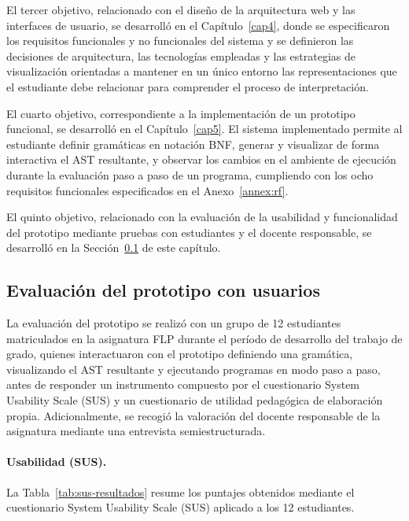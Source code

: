 El tercer objetivo, relacionado con el diseño de la arquitectura web y las interfaces de usuario, se desarrolló en el Capítulo~\ref{cap4}, donde se especificaron los requisitos funcionales y no funcionales del sistema y se definieron las decisiones de arquitectura, las tecnologías empleadas y las estrategias de visualización orientadas a mantener en un único entorno las representaciones que el estudiante debe relacionar para comprender el proceso de interpretación.

El cuarto objetivo, correspondiente a la implementación de un prototipo funcional, se desarrolló en el Capítulo~\ref{cap5}. El sistema implementado permite al estudiante definir gramáticas en notación BNF, generar y visualizar de forma interactiva el AST resultante, y observar los cambios en el ambiente de ejecución durante la evaluación paso a paso de un programa, cumpliendo con los ocho requisitos funcionales especificados en el Anexo~\ref{annex:rf}.

El quinto objetivo, relacionado con la evaluación de la usabilidad y funcionalidad del prototipo mediante pruebas con estudiantes y el docente responsable, se desarrolló en la Sección~\ref{sec:evaluacion-prototipo} de este capítulo.

\subsection{Evaluación del prototipo con usuarios}
\label{sec:evaluacion-prototipo}

La evaluación del prototipo se realizó con un grupo de 12 estudiantes matriculados en la asignatura FLP durante el período de desarrollo del trabajo de grado, quienes interactuaron con el prototipo definiendo una gramática, visualizando el AST resultante y ejecutando programas en modo paso a paso, antes de responder un instrumento compuesto por el cuestionario System Usability Scale (SUS) y un cuestionario de utilidad pedagógica de elaboración propia. Adicionalmente, se recogió la valoración del docente responsable de la asignatura mediante una entrevista semiestructurada.

\paragraph{Usabilidad (SUS).} La Tabla~\ref{tab:sus-resultados} resume los puntajes obtenidos mediante el cuestionario System Usability Scale (SUS) aplicado a los 12 estudiantes.

